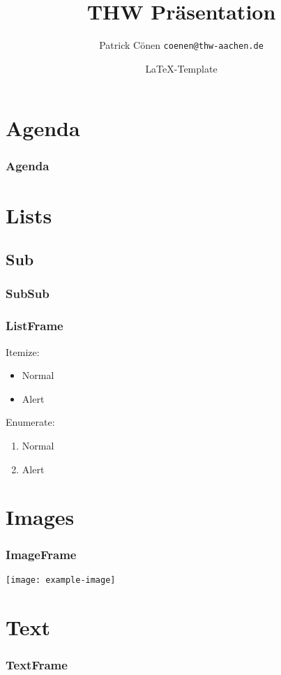 \documentclass{beamer}
\title{THW Präsentation}
\author{Patrick Cönen \texttt{coenen@thw-aachen.de}}
\date{\LaTeX-Template\\\insertauthor}
\begin{document}
\begin{frame}
  \titlepage
\end{frame}

\section*{Agenda}
\begin{frame}
  \frametitle{Agenda}
  \tableofcontents
\end{frame}

\section{Lists}
\subsection{Sub}
\subsubsection{SubSub}

\begin{frame}
  \frametitle{ListFrame}
  Itemize:
  \begin{itemize}
    \item{Normal}
    \item<alert@1>{Alert}
  \end{itemize}
  Enumerate:
  \begin{enumerate}
    \item{Normal}
    \item<alert@1>{Alert}
  \end{enumerate}
\end{frame}

\section{Images}

\begin{frame}
  \frametitle{ImageFrame}
    \centering
    \texttt{[image: example-image]}
\end{frame}

\section{Text}

\begin{frame}
  \frametitle{TextFrame}
  \small{}
  \blindtext
\end{frame}
\end{document}
